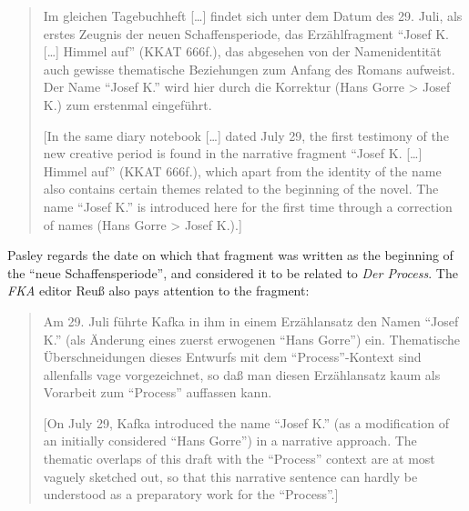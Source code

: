 \begin{paper}
\begin{quote}
Im gleichen Tagebuchheft [\ldots] findet sich unter dem Datum des 29.
Juli, als erstes Zeugnis der neuen Schaffensperiode, das Erzählfragment
``Josef K. [\ldots] Himmel auf'' (KKAT 666f.), das abgesehen von der
Namenidentität auch gewisse thematische Beziehungen zum Anfang des
Romans aufweist. Der Name ``Josef K.'' wird hier durch die Korrektur
(Hans Gorre \textgreater{} Josef K.) zum erstenmal eingeführt.

\begin{flushright}
    \parencite[73]{kafka_zur_1990}
\end{flushright}

{[}In the same diary notebook [\ldots] dated July 29, the first
testimony of the new creative period is found in the narrative fragment
``Josef K. [\ldots] Himmel auf'' (KKAT 666f.), which apart from the identity of
the name also contains certain themes related to the beginning of the
novel. The name ``Josef K.'' is introduced here for the first time
through a correction of names (Hans Gorre \textgreater{} Josef K.).{]}
\end{quote}

Pasley regards the date on which that fragment was written as the
beginning of the ``neue Schaffensperiode'', and considered it to be
related to \emph{Der Process}. The \emph{FKA} editor Reuß also pays
attention to the fragment:

\begin{quote}
Am 29. Juli führte Kafka in ihm in einem Erzählansatz den Namen ``Josef
K.'' (als Änderung eines zuerst erwogenen ``Hans Gorre'') ein.
Thematische Überschneidungen dieses Entwurfs mit dem ``Process''-Kontext
sind allenfalls vage vorgezeichnet, so daß man diesen Erzählansatz kaum
als Vorarbeit zum ``Process'' auffassen kann. 

\begin{flushright}
    \parencite[4]{kafka_zur_1997}
\end{flushright}

{[}On July 29, Kafka introduced the name ``Josef K.'' (as a modification
of an initially considered ``Hans Gorre'') in a narrative approach. The
thematic overlaps of this draft with the ``Process'' context are at most
vaguely sketched out, so that this narrative sentence can hardly be
understood as a preparatory work for the ``Process''.{]}
\end{quote}


\end{paper}
